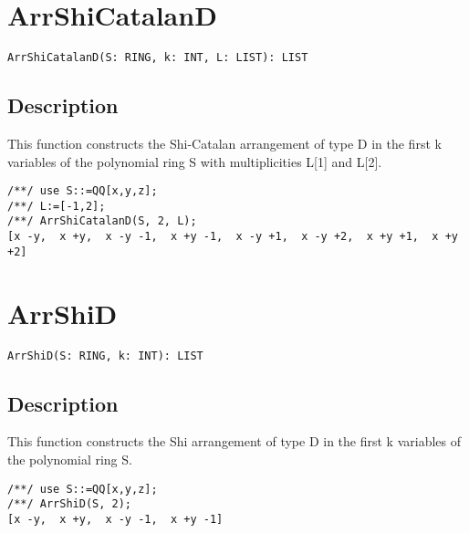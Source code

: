 \documentclass[a4paper]{mybook}
\newenvironment{command}{}{} %
\begin{document}
\section{ArrShiCatalanD}
\label{ArrShiCatalanD}
\begin{command} %


\begin{Verbatim}[label=syntax, rulecolor=\color{MidnightBlue},
frame=single]
ArrShiCatalanD(S: RING, k: INT, L: LIST): LIST 
\end{Verbatim}


\subsection*{Description}

This function constructs the Shi-Catalan arrangement of type D in the first k variables of the polynomial ring S with multiplicities L[1] and L[2].
\begin{Verbatim}[label=example, rulecolor=\color{PineGreen}, frame=single]
/**/ use S::=QQ[x,y,z];	
/**/ L:=[-1,2];
/**/ ArrShiCatalanD(S, 2, L);
[x -y,  x +y,  x -y -1,  x +y -1,  x -y +1,  x -y +2,  x +y +1,  x +y +2]
\end{Verbatim}


\end{command} %

\section{ArrShiD}
\label{ArrShiD}
\begin{command} %


\begin{Verbatim}[label=syntax, rulecolor=\color{MidnightBlue},
frame=single]
ArrShiD(S: RING, k: INT): LIST 
\end{Verbatim}


\subsection*{Description}

This function constructs the Shi arrangement of type D in the first k variables of the polynomial ring S.
\begin{Verbatim}[label=example, rulecolor=\color{PineGreen}, frame=single]
/**/ use S::=QQ[x,y,z];	
/**/ ArrShiD(S, 2);
[x -y,  x +y,  x -y -1,  x +y -1]
\end{Verbatim}


\end{command} %
\end{document}
